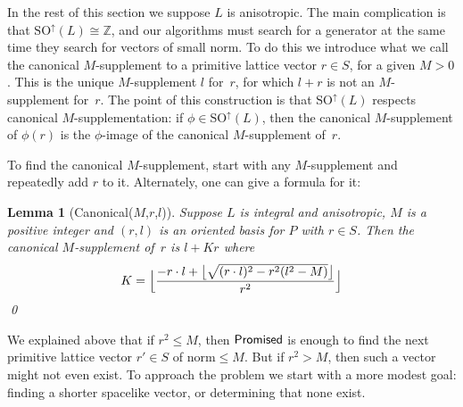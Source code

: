 \documentclass[12pt]{amsart}
\DeclarePairedDelimiter{\floor}{\lfloor}{\rfloor}
\def\SO{\mathrm{SO}}
\def\SOup{\SO^{\uparrow}}
\def\Z{\mathbb{Z}}
\def\SOup{\mathrm{SO}^{\uparrow}}
\let\iso\cong
\def\cong{\equiv}
\numberwithin{theorem}{section}
\numberwithin{equation}{section}
\numberwithin{figure}{section}
\newtheorem{lemma}[theorem]{Lemma}
\theoremstyle{remark}
\begin{document}
In the rest of this section we suppose $L$ is anisotropic.  The main
complication is that $\SOup(L)\iso\Z$, and our
algorithms must search for a generator at the same time they
search for vectors of small norm.  To do this we introduce
what we call the canonical $M$-supplement to a primitive 
lattice vector $r\in S$, for a given $M>0$.  
This is the unique $M$-supplement $l$ for~$r$, for which
$l+r$ is not an $M$-supplement for~$r$.  
The point of this construction is that 
$\SOup(L)$ respects canonical 
$M$-supplementation: if $\phi\in\SOup(L)$,
then the canonical $M$-supplement of $\phi(r)$ is the
$\phi$-image of the canonical $M$-supplement of~$r$.

To find the
canonical $M$-supplement, start with any $M$-supplement and
repeatedly add $r$ to it.  Alternately, one can give
a formula for it:

\begin{lemma}[{\sf Canonical($M$,$r$,$l$)}]
	\label{LemmaCanonical}
	Suppose $L$ is integral and anisotropic, $M$ is a positive integer and 
	$(r,l)$ is an oriented basis for $P$ with $r\in S$.   
    Then the canonical $M$-supplement of~$r$ is
	$l+Kr$ where
	\begin{displaymath}
		K=
			\floor[\Big]{\frac{-r\cdot l+\floor[\big]{\sqrt{(r\cdot l)^2-r^2(l^2-M)}}}{r^2}}
	\end{displaymath}
    \qed
\end{lemma}

We explained above that  if $r^2\leq M$, then ${\sf Promised}$
is enough to find the next primitive lattice vector $r'\in S$
of norm${}\leq M$.  But if $r^2>M$, then such a vector
might not even exist.  To approach the problem we start
with a more modest goal: finding a shorter spacelike vector,
or determining that none exist.
\end{document}
